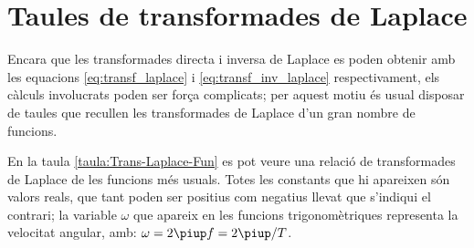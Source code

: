 \section{Taules de transformades de Laplace}

Encara que les transformades directa i inversa de Laplace es poden
obtenir amb les equacions \eqref{eq:transf_laplace} i
\eqref{eq:transf_inv_laplace} respectivament, els càlculs
involucrats poden ser força complicats; per aquest motiu és usual
disposar de taules que recullen les transformades de Laplace d'un
gran nombre de funcions.

En la taula \vref{taula:Trans-Laplace-Fun} es pot veure una relació de
transformades de Laplace de les funcions més usuals. Totes les
constants que hi apareixen són valors reals, que tant poden ser
positius com negatius llevat que s'indiqui el contrari; la variable
$\omega$ que apareix en les funcions trigonomètriques representa la
velocitat angular, amb: $\omega=2\piup f=2\piup/T$.

